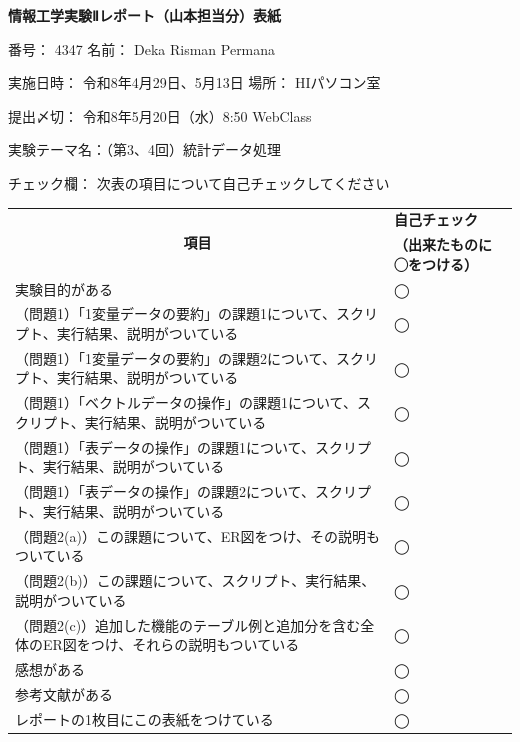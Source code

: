 \documentclass[12pt,a4paper]{ltjsarticle}
\title{}
\date{}
\author{}
\begin{document}

\begin{titlepage}
\setlength{\parindent}{0pt}
  
\begin{center}
{\huge \textbf{情報工学実験Ⅱレポート（山本担当分）表紙}}\\[0.8cm]
\end{center}

\begin{large}
番号： 4347 名前： Deka Risman Permana\vspace{0.3cm}

実施日時： 令和8年4月29日、5月13日 場所： HIパソコン室\vspace{0.3cm}

提出〆切： 令和8年5月20日（水）8:50 WebClass\vspace{0.3cm}

実験テーマ名：（第3、4回）統計データ処理\vspace{0.3cm}

チェック欄： 次表の項目について自己チェックしてください
\end{large}

\begin{center}
\begin{tabularx}{\textwidth}{|X|>{\centering\arraybackslash}m{5cm}|}
  \hline
  \multicolumn{1}{|c|}{\multirow{2}{*}{\textbf{項目}}} & \textbf{自己チェック} \\
  & \textbf{（出来たものに◯をつける）} \\
  \hline
  実験目的がある & ◯\\
  \hline
  （問題1）「1変量データの要約」の課題1について、スクリプト、実行結果、説明がついている & ◯\\
  \hline
  （問題1）「1変量データの要約」の課題2について、スクリプト、実行結果、説明がついている & ◯\\
  \hline
  （問題1）「ベクトルデータの操作」の課題1について、スクリプト、実行結果、説明がついている & ◯\\
  \hline
  （問題1）「表データの操作」の課題1について、スクリプト、実行結果、説明がついている & ◯\\
  \hline
  （問題1）「表データの操作」の課題2について、スクリプト、実行結果、説明がついている & ◯\\
  \hline
  （問題2(a)）この課題について、ER図をつけ、その説明もついている & ◯\\
  \hline
  （問題2(b)）この課題について、スクリプト、実行結果、説明がついている & ◯\\
  \hline
  （問題2(c)）追加した機能のテーブル例と追加分を含む全体のER図をつけ、それらの説明もついている & ◯\\
  \hline
  感想がある & ◯\\
  \hline
  参考文献がある & ◯\\
  \hline
  レポートの1枚目にこの表紙をつけている & ◯\\
  \hline
\end{tabularx}
\end{center}
  
\end{titlepage}
\end{document}
